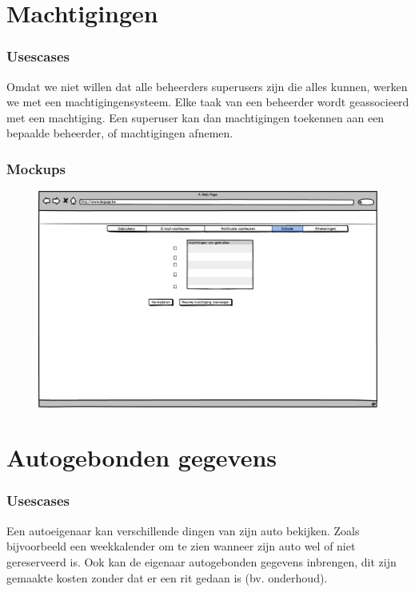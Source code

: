\documentclass[11pt,a4paper,oneside]{article}
\begin{document}
\setcounter{section}{0}
\setcounter{subsection}{0}
\part{Machtigingen}
\section{Usescases}
Omdat we niet willen dat alle beheerders superusers zijn die alles kunnen, werken we met een machtigingensysteem. Elke taak van een beheerder
wordt geassocieerd met een machtiging. Een superuser kan dan machtigingen toekennen aan een bepaalde beheerder, of machtigingen afnemen.

\section{Mockups}
\begin{figure}[H]\includegraphics[width=\textwidth]{../../mockups/admin_machtigingentoevoegen.png}\end{figure}

\setcounter{section}{0}
\setcounter{subsection}{0}
\part{Autogebonden gegevens}
\section{Usescases}
Een autoeigenaar kan verschillende dingen van zijn auto bekijken. Zoals bijvoorbeeld een weekkalender om te zien wanneer zijn auto wel of niet
gereserveerd is. Ook kan de eigenaar autogebonden gegevens inbrengen, dit zijn gemaakte kosten zonder dat er een rit gedaan is (bv. onderhoud).
\end{document}
